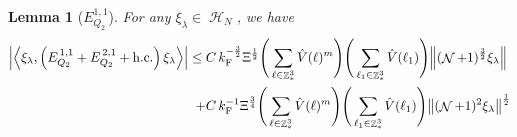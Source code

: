 \documentclass[12pt,a4paper]{article}
\numberwithin{equation}{section}
\newcommand{\1}{\mathbb{I}}
\newcommand{\F}{\mathrm{F}}
\DeclareMathOperator{\Z}{\mathbb{Z}}
\DeclareMathOperator{\HH}{\mathcal{H}}
\DeclareMathOperator{\NN}{\mathcal{N}}
\newcommand{\half}{\frac{1}{2}}
\newcommand{\eva}[1]{\left\langle #1 \right\rangle}
\theoremstyle{plain}
\newtheorem{lemma}[theorem]{Lemma}
\theoremstyle{definition}
\theoremstyle{remark}
\theoremstyle{plain}
\theoremstyle{definition}
\theoremstyle{remark}
\begin{document}
\begin{lemma}[$E_{Q_2}^{1,1}$]\label{lem:EQ211}
    For any $\xi_\lambda \in \HH_N$, we have
    \begin{align}
    	\abs{\eva{\xi_\lambda,\left(E^{\,1,1}_{Q_2}+E^{\,2,1}_{Q_2}+\mathrm{h.c.}\right) \xi_\lambda }}
    	 \leq \; &C\,  k_{\F}^{-\frac{3}{2}} \Xi^\half \Bigg(\sum\limits_{\ell \in \Z^3_*} \hat{V}(\ell)^m\Bigg)\Bigg( \sum\limits_{\ell_1 \in \Z^3_*} \hat{V}(\ell_1) \Bigg) \norm { (\NN+1)^{\frac{3}{2}} \xi_\lambda }\\
    	 \;+ &C\, k_{\F}^{-1}\Xi^{\frac{3}{4}} \Bigg(\sum\limits_{\ell \in \Z^3_*} \hat{V}(\ell)^m\Bigg) \Bigg(\sum\limits_{\ell_1 \in \Z^3_*} \hat{V}(\ell_1) \Bigg)  \norm{ (\NN+1)^2\xi_\lambda}^\half\label{eq:estEQ211}
    \end{align}
\end{lemma}
\end{document}
